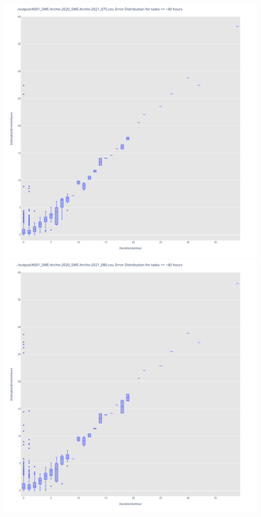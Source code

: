 \includegraphics[width=\textwidth]{Scripts/output/A001_SWE-Archiv-2020_SWE-Archiv-2021_075.csv.error_distribution.png}
\includegraphics[width=\textwidth]{Scripts/output/A001_SWE-Archiv-2020_SWE-Archiv-2021_080.csv.error_distribution.png}

